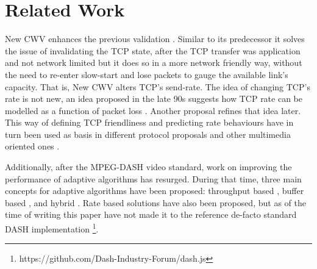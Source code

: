 \documentclass[10pt,sigconf]{acmart}
\begin{document}





\section{Related Work}

New CWV enhances the previous validation \cite{rfc2861-2000-padhye-congestion-window-validation}. Similar to its predecessor it solves the issue of invalidating the TCP state, after the TCP transfer was application and not network limited but it does so in a more network friendly way, without the need to re-enter slow-start and lose packets to gauge the available link's capacity. That is, New CWV alters TCP's send-rate. The idea of changing TCP's rate is not new, an idea proposed in the late 90s suggests how TCP rate can be modelled as a function of packet loss \cite{Mathis-1997-the-macroscopic-behavior-tcp}. Another proposal \cite{Padhye-1998-modelling-tcp-throughput} refines that idea later. This way of defining TCP friendliness and predicting rate behaviours have in turn been used as basis in different protocol proposals \cite{rfc-5348-tfrc,Rossi-2010-ledbat,Arun-2018-copa} and other multimedia oriented ones \cite{Carlucci-2016-Analysis-WebRTC,Choi-2007-fairer-tfrc}.


Additionally, after the MPEG-DASH video standard, work on improving the performance of adaptive algorithms has resurged. During that time, three main concepts for adaptive algorithms have been proposed: throughput based \cite{Sun-2016-cs2p, Jiang-2012-improving-fairness-http-video-festive}, buffer based \cite{Spiteri-2016-BOLA,Huang-2015-A-buffer-based-approach-to-rate-adaptation-bba}, and hybrid \cite{Spiteri-2019-from-theory-to-practice-sabre,Wang-2016-squad}. Rate based solutions \cite{Li-2014-probe-and-adapt-panda,Liu-2011-rate-adaptation} have also been proposed, but as of the time of writing this paper have not made it to the reference de-facto standard DASH implementation \footnote{https://github.com/Dash-Industry-Forum/dash.js}.
\end{document}
